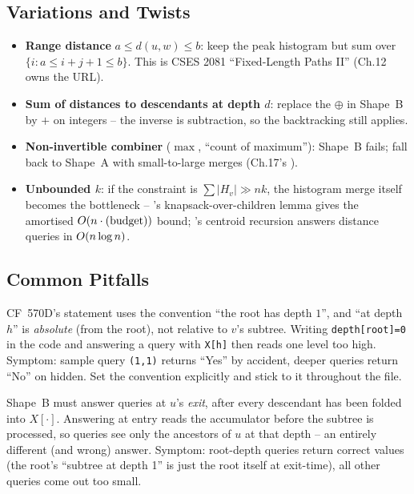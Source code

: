 \subsection{Variations and Twists}

\begin{itemize}[nosep]
  \item \textbf{Range distance} $a\le d(u,w)\le b$: keep the peak
        histogram but sum over $\{i: a\le i+j+1\le b\}$. This is CSES
        2081 ``Fixed-Length Paths II'' (Ch.12 owns the URL). \hfill{}
  \item \textbf{Sum of distances to descendants at depth $d$}: replace
        the $\oplus$ in Shape~B by $+$ on integers -- the inverse is
        subtraction, so the backtracking still applies. \hfill{}
  \item \textbf{Non-invertible combiner} ($\max$, ``count of maximum''):
        Shape~B fails; fall back to Shape~A with small-to-large merges
        (Ch.17's ). \hfill{}
  \item \textbf{Unbounded $k$}: if the constraint is $\sum |H_v| \gg nk$,
        the histogram merge itself becomes the bottleneck --
        's knapsack-over-children lemma gives the amortised
        $O(n\cdot\text{(budget)})$ bound; 's centroid
        recursion answers distance queries in $O(n\log n)$.
        \hfill{}
\end{itemize}

\subsection{Common Pitfalls}

\begin{warningbox}
CF~570D's statement uses the convention ``the root has depth $1$'', and
``at depth $h$'' is \emph{absolute} (from the root), not relative to
$v$'s subtree. Writing \lstinline{depth[root]=0} in the code and
answering a query with \lstinline{X[h]} then reads one level too high.
Symptom: sample query \lstinline{(1,1)} returns ``Yes'' by accident,
deeper queries return ``No'' on hidden. Set the convention explicitly
and stick to it throughout the file.
\end{warningbox}

\begin{warningbox}
Shape~B must answer queries at $u$'s \emph{exit}, after every descendant
has been folded into $\mathit{X}[\cdot]$. Answering at entry reads the
accumulator before the subtree is processed, so queries see only the
ancestors of $u$ at that depth -- an entirely different (and wrong)
answer. Symptom: root-depth queries return correct values (the root's
``subtree at depth 1'' is just the root itself at exit-time), all other
queries come out too small.
\end{warningbox}

